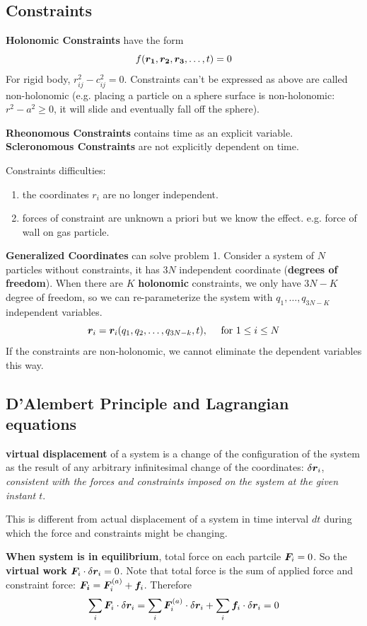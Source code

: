 \documentclass[12pt]{article}
\begin{document}
\subsection{Constraints}
\textbf{Holonomic Constraints} have the form $$f(\boldsymbol{r_1}, \boldsymbol{r_2}, \boldsymbol{r_3}, \ldots, t) = 0$$
For rigid body, $r_{ij}^2 - c_{ij}^2 = 0$. Constraints can't be expressed as above are called non-holonomic (e.g. placing a particle on a sphere surface is non-holonomic: $r^2 - a^2 \geq 0$, it will slide and eventually fall off the sphere).

\textbf{Rheonomous Constraints} contains time as an explicit variable. \textbf{Scleronomous Constraints} are not explicitly dependent on time.

Constraints difficulties:
\begin{enumerate}
	\item the coordinates $r_i$ are no longer independent.
	\item forces of constraint are unknown a priori but we know the effect. e.g. force of wall on gas particle.
\end{enumerate}

\textbf{Generalized Coordinates} can solve problem 1. Consider a system of $N$ particles without constraints, it has $3N$ independent coordinate (\textbf{degrees of freedom}). When there are $K$ \textbf{holonomic} constraints, we only have $3N-K$ degree of freedom, so we can re-parameterize the system with $q_1,\ldots,q_{3N-K}$ independent variables. 
$$  \boldsymbol{r}_i = \boldsymbol{r}_i(q_1, q_2, \ldots, q_{3N-k}, t), \quad \textnormal{ for $1\leq i \leq N$}$$
If the constraints are non-holonomic, we cannot eliminate the dependent variables this way. 

\subsection{D'Alembert Principle and Lagrangian equations}

\textbf{virtual displacement} of a system is a change of the configuration of the system as the result of any arbitrary infinitesimal change of the coordinates:  $\delta \boldsymbol{r}_i$, \textit{consistent with the forces and constraints imposed on the system at the given instant $t$}.  

This is different from actual displacement of a system in time interval $dt$ during which the force and constraints might be changing.

\textbf{When system is in equilibrium}, total force on each partcile $\boldsymbol{F}_i = 0$. So the \textbf{virtual work} $\boldsymbol{F}_i \cdot \delta \boldsymbol{r}_i = 0$.  Note that total force is the sum of applied force and constraint force: $\boldsymbol{F_i} = \boldsymbol{F}^{(a)}_i +  \boldsymbol{f}_i$. Therefore
$$ \sum_i \boldsymbol{F}_i \cdot \delta \boldsymbol{r}_i =   \sum_i \boldsymbol{F}^{(a)}_i \cdot \delta \boldsymbol{r}_i +  \sum_i \boldsymbol{f}_i \cdot \delta \boldsymbol{r}_i = 0$$
\end{document}
